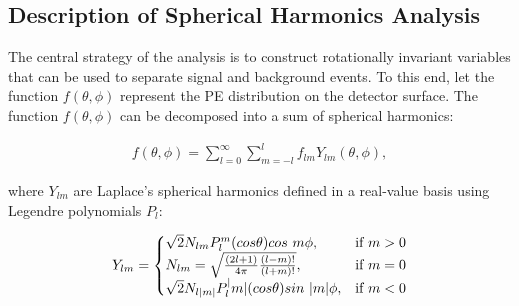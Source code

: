 %

\subsection{Description of Spherical Harmonics Analysis}

The central strategy of the analysis is to construct rotationally invariant variables that can be used to separate signal and background events. To this end, let the  function $f(\theta,\phi)$ represent the PE distribution on the detector surface. The function $f(\theta,\phi)$ can be decomposed into a sum of spherical harmonics:

\begin{eqnarray}
\label{eq1}
f(\theta,\phi) = \sum_{l=0}^{\infty} \sum_{m=-l}^{l} f_{lm} Y_{lm}(\theta,\phi),
\end{eqnarray}

where $Y_{lm}$ are Laplace's spherical harmonics defined in a real-value basis using Legendre polynomials $P_l$:

\begin{eqnarray}
\label{eq2}
Y_{lm} = \left\{
  \begin{array}{@{}ll@{}}
    \sqrt{2}N_{lm}P_l^m(cos\theta)cos~m\phi, & \text{if}\ m>0 \\
    N_{lm} = \sqrt{\frac{(2l+1)}{4\pi} \frac{(l-m)!}{(l+m)!}}, & \text{if}\ m=0 \\
    \sqrt{2}N_{l|m|}P_l^|m|(cos\theta)sin~|m|\phi, & \text{if}\ m<0
  \end{array}\right.
\end{eqnarray}

